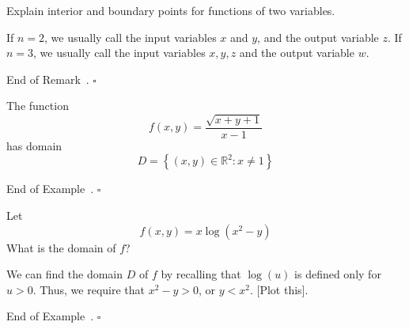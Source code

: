 \documentclass[10pt]{article}
\DeclareRobustCommand{\demph}[1]{%
  \ifmmode
  {\color{Blue}#1}%
  \else
  {\color{Blue}\bfseries\slshape #1}%
  \fi
}
\newtheorem{remark}[theorem]{Remark}
\theoremstyle{definition}
\newtheorem{definition}[theorem]{Definition}
\newtheorem{example}[theorem]{Example}
\renewenvironment{example}
{\begin{oldexample}}
  {\par\smallskip\hfill   End of Example~\theexample. $\square$    \par\end{oldexample}}
\renewenvironment{remark}
{\begin{oldremark}} 
  {\par\smallskip\hfill   End of Remark~\theremark. $\square$    \par\end{oldremark}}
\newcommand{\1}[1]{\textbf{1}_{\left[#1\right]}} %
\def\R{\mathbb{R}} %
\begin{document}
Explain interior and boundary points for functions of two variables.

\begin{remark}
  If $n=2$, we usually call the input variables $x$ and $y$, and the
  output variable $z$. If $n=3$, we usually call the input variables $x,y,z$ and
  the output variable $w$.
\end{remark}

\begin{example}
  The function
  \begin{equation*}
    f(x,y) = \frac{\sqrt{x+y+1}}{x-1}
  \end{equation*}
  has domain 
  \begin{equation*}
    D = \left\{(x,y)\in \R^{2}: x\neq 1\right\}
  \end{equation*}
\end{example}

\begin{example}
  Let
  \begin{equation*}
    f(x,y)= x \log \left( x^{2}-y \right)
  \end{equation*}
  What is the domain of $f$?
  
  We can find the domain $D$ of $f$ by recalling that $\log(u)$ is defined only for $u>0$. Thus, we
  require that $x^{2}-y>0$, or $y<x^{2}$. [Plot this].
\end{example}




\end{document}
